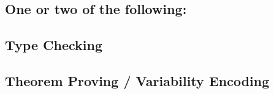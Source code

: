 
\subsection{One or two of the following:}

\subsection{Type Checking} %



\subsection{Theorem Proving / Variability Encoding}

\subsection{} %

\begin{frame}{}
\end{frame}